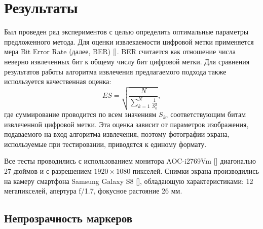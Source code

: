\documentclass[12pt,a4paper]{article}
\begin{document}
\section{Результаты}
Был проведен ряд экспериментов с целью определить оптимальные параметры предложенного метода.
Для оценки извлекаемости цифровой метки применяется мера Bit Error Rate (далее, BER) [].
BER считается как отношение числа неверно извлеченных бит к общему числу бит цифровой метки. Для сравнения результатов работы алгоритма извлечения предлагаемого подхода также используется качественная оценка:
$$ES = \sqrt{\frac{N}{\sum_{k = 1}^{N}\frac{1}{S_k^2}}},$$ 
где суммирование проводится по всем значениям $S_k$, соответствующим битам извлеченной цифровой метки.
Эта оценка зависит от параметров изображения, подаваемого на вход алгоритма извлечения, поэтому фотографии экрана, используемые при тестировании, приводятся к единому формату.

Все тесты проводились с использованием монитора AOC-i2769Vm [] диагональю 27 дюймов и с разрешением $1920\times 1080$ пикселей.
Снимки экрана производились на камеру смартфона Samsung Galaxy S8 [], обладающую характеристиками: 12 мегапикселей, апертура f/1.7, фокусное растояние 26 мм.
\subsection{Непрозрачность маркеров}
\end{document}
